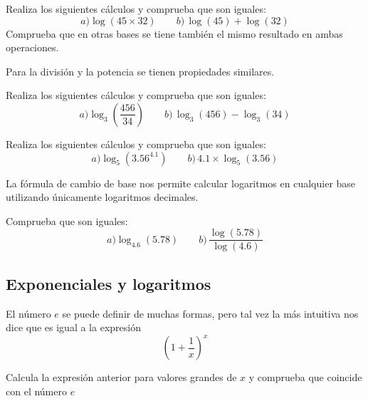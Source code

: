 \documentclass[12pt]{article}
\newenvironment{capitulo}{\begin{tcolorbox}[colback=blue!5!white,colframe=red!75!black]}{\end{tcolorbox}\bigskip}
\newenvironment{ejer}{\begin{tcolorbox}[center title, 
fonttitle=\sffamily\bfseries,colback=blue!5,colframe=orange]}{\end{tcolorbox}}
\begin{document}
\begin{ejer}

Realiza los siguientes cálculos y comprueba que son iguales:
\[
a)\log(45\times 32) \qquad b)\, \log(45) + \log(32)
\]
Comprueba que en otras bases se tiene también el mismo resultado en ambas operaciones.

\end{ejer}

Para la división y la potencia se tienen propiedades similares.

\begin{ejer}

Realiza los siguientes cálculos y comprueba que son iguales:
\[
a)\log_3\left(\frac{456}{34}\right) \qquad b)\, \log_3(456)-  \log_3(34)
\]

\end{ejer}

\begin{ejer}

Realiza los siguientes cálculos y comprueba que son iguales:
\[
a)\log_5(3.56^{4.1}) \qquad b)\, 4.1\times \log_5(3.56)
\]

\end{ejer}

La fórmula de cambio de base nos permite calcular logaritmos en cualquier base utilizando únicamente logaritmos decimales.

\begin{ejer}

Comprueba que son iguales:
\[
a)\log_{4.6}(5.78) \qquad b)\, \frac{\log(5.78)}{\log(4.6)}
\]

\end{ejer}

\newpage

\begin{capitulo}
\section*{Exponenciales y logaritmos}
\end{capitulo}

El número $e$ se puede definir de muchas formas, pero tal vez la más intuitiva nos dice que es igual a la expresión
\[
\left(1+\frac{1}{x}\right)^x
\]

\begin{ejer}

Calcula la expresión anterior para valores grandes de $x$ y comprueba que coincide con el número $e$

\end{ejer}
\end{document}
